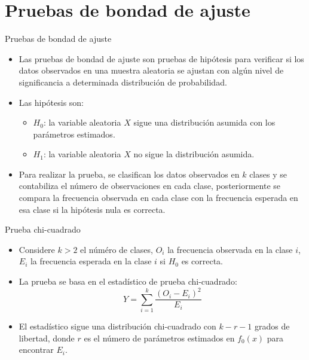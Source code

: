 \section{Pruebas de bondad de ajuste}

\begin{frame}{Pruebas de bondad de ajuste}
    \begin{itemize}
        \item Las pruebas de bondad de ajuste son pruebas de hipótesis para verificar si los datos observados en una muestra aleatoria se ajustan con algún nivel de significancia a determinada distribución de probabilidad.
        \item Las hipótesis son:
        \begin{itemize}
            \item $H_0$: la variable aleatoria $X$ sigue una distribución asumida con los parámetros estimados.
            \item $H_1$: la variable aleatoria $X$ no sigue la distribución asumida.
        \end{itemize}
        \item Para realizar la prueba, se clasifican los datos observados en $k$ clases y se contabiliza el número de observaciones en cada clase, posteriormente se compara la frecuencia observada en cada clase con la frecuencia esperada en esa clase si la hipótesis nula es correcta.
    \end{itemize}
\end{frame}

\begin{frame}{Prueba chi-cuadrado}
    \begin{itemize}
        \item Considere $k>2$ el núméro de clases, $O_i$ la frecuencia observada en la clase $i$, $E_i$ la frecuencia esperada en la clase $i$ si $H_0$ es correcta.
        \item La prueba se basa en el estadístico de prueba chi-cuadrado:
        \[Y=\sum_{i=1}^{k}{\frac{\left(O_i-E_i\right)^2}{E_i}}\]
        \item El estadístico sigue una distribución chi-cuadrado con $k-r-1$ grados de libertad, donde $r$ es el número de parámetros estimados en $f_0(x)$ para encontrar $E_i$. 
    \end{itemize}
\end{frame}


